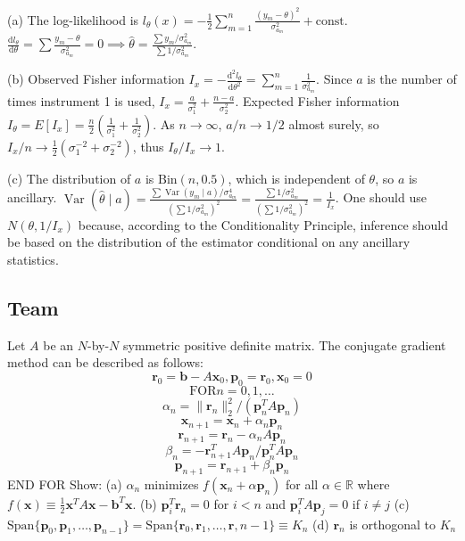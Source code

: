 \begin{solution}
(a) The log-likelihood is $l_\theta(x) = -\frac{1}{2} \sum_{m=1}^n \frac{(y_m - \theta)^2}{\sigma_{a_m}^2} + \text{const}$.
$\frac{\mathrm{d} l_\theta}{\mathrm{d} \theta} = \sum \frac{y_m - \theta}{\sigma_{a_m}^2} = 0 \implies \hat{\theta} = \frac{\sum y_m / \sigma_{a_m}^2}{\sum 1 / \sigma_{a_m}^2}$.

(b) Observed Fisher information $I_x = -\frac{\mathrm{d}^2 l_\theta}{\mathrm{d} \theta^2} = \sum_{m=1}^n \frac{1}{\sigma_{a_m}^2}$.
Since $a$ is the number of times instrument 1 is used, $I_x = \frac{a}{\sigma_1^2} + \frac{n-a}{\sigma_2^2}$.
Expected Fisher information $I_\theta = E[I_x] = \frac{n}{2} (\frac{1}{\sigma_1^2} + \frac{1}{\sigma_2^2})$.
As $n \to \infty$, $a/n \to 1/2$ almost surely, so $I_x / n \to \frac{1}{2}(\sigma_1^{-2} + \sigma_2^{-2})$, thus $I_\theta / I_x \to 1$.

(c) The distribution of $a$ is $\text{Bin}(n, 0.5)$, which is independent of $\theta$, so $a$ is ancillary.
$\operatorname{Var}(\hat{\theta} \mid a) = \frac{\sum \operatorname{Var}(y_m \mid a) / \sigma_{a_m}^4}{(\sum 1/\sigma_{a_m}^2)^2} = \frac{\sum 1/\sigma_{a_m}^2}{(\sum 1/\sigma_{a_m}^2)^2} = \frac{1}{I_x}$.
One should use $N(\theta, 1/I_x)$ because, according to the Conditionality Principle, inference should be based on the distribution of the estimator conditional on any ancillary statistics.
\end{solution}

\subsection{Team}

\begin{exercise}
\label{applied:2011:7}
Let $A$ be an $N$-by-$N$ symmetric positive definite matrix. The conjugate gradient method can be described as follows:
\[
\mathbf {r} _ {0} = \mathbf {b} - A \mathbf {x} _ {0}, \mathbf {p} _ {0} = \mathbf {r} _ {0}, \mathbf {x} _ {0} = 0
\]
\[
\mathrm {FOR} n = 0, 1, \dots
\]
\[
\alpha_ {n} = \lVert \mathbf {r} _ {n} \rVert_ {2} ^ {2} / (\mathbf {p} _ {n} ^ {T} A \mathbf {p} _ {n})
\]
\[
\mathbf {x} _ {n + 1} = \mathbf {x} _ {n} + \alpha_ {n} \mathbf {p} _ {n}
\]
\[
\mathbf {r} _ {n + 1} = \mathbf {r} _ {n} - \alpha_ {n} A \mathbf {p} _ {n}
\]
\[
\beta_ {n} = - \mathbf {r} _ {n + 1} ^ {T} A \mathbf {p} _ {n} / \mathbf {p} _ {n} ^ {T} A \mathbf {p} _ {n}
\]
\[
\mathbf {p} _ {n + 1} = \mathbf {r} _ {n + 1} + \beta_ {n} \mathbf {p} _ {n}
\]
END FOR
Show:
(a) $\alpha _ { n }$ minimizes $f ( \mathbf { x } _ { n } + \alpha \mathbf { p } _ { n } )$ for all $\alpha \in \mathbb { R }$ where $f (\mathbf {x}) \equiv \frac {1}{2} \mathbf {x} ^ {T} A \mathbf {x} - \mathbf {b} ^ {T} \mathbf {x}$.
(b) $\mathbf { p } _ { i } ^ { T } \mathbf { r } _ { n } = 0$ for $i < n$ and $\mathbf { p } _ { i } ^ { T } A \mathbf { p } _ { j } = 0$ if $i \neq j$
(c) $\mathrm { Span } \{ \mathbf { p } _ { 0 } , \mathbf { p } _ { 1 } , \dots , \mathbf { p } _ { n - 1 } \} = \mathrm { Span } \{ \mathbf { r } _ { 0 } , \mathbf { r } _ { 1 } , \dots , \mathbf { r } , n - 1 \} \equiv K _ { n }$
(d) $\mathbf { r } _ { n }$ is orthogonal to $K _ { n }$
\end{exercise}

